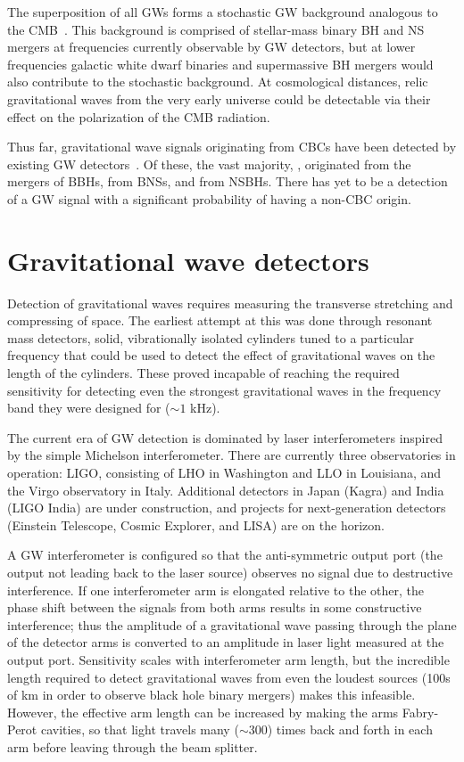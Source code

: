 The superposition of all \acp{GW} forms a stochastic \ac{GW} background analogous to the \ac{CMB}~\citep{Christensen_2018}.
This background is comprised of stellar-mass binary \ac{BH} and \ac{NS} mergers at frequencies currently observable by \ac{GW} detectors, but at lower frequencies galactic white dwarf binaries and supermassive BH mergers would also contribute to the stochastic background.
At cosmological distances, relic gravitational waves from the very early universe could be detectable via their effect on the polarization of the \ac{CMB} radiation.

Thus far, \XX gravitational wave signals originating from \acp{CBC} have been detected by existing \ac{GW} detectors~\citep{gwtc3}. Of these, the vast majority, \XX, originated from the mergers of \acp{BBH}, \XX from \acp{BNS}, and \XX from \acp{NSBH}. There has yet to be a detection of a \ac{GW} signal with a significant probability of having a non-\ac{CBC} origin.


\section{Gravitational wave detectors}\label{sec:gw-detectors}

Detection of gravitational waves requires measuring the transverse stretching and compressing of space. The earliest attempt at this was done through resonant mass detectors, solid, vibrationally isolated cylinders tuned to a particular frequency that could be used to detect the effect of gravitational waves on the length of the cylinders. These proved incapable of reaching the required sensitivity for detecting even the strongest gravitational waves in the frequency band they were designed for ($\sim1$ kHz).

The current era of \ac{GW} detection is dominated by laser interferometers inspired by the simple Michelson interferometer. There are currently three observatories in operation: \ac{LIGO}, consisting of \ac{LHO} in Washington and \ac{LLO} in Louisiana, and the Virgo observatory in Italy. Additional detectors in Japan (Kagra) and India (\ac{LIGO} India) are under construction, and projects for next-generation detectors (Einstein Telescope, Cosmic Explorer, and \ac{LISA}) are on the horizon.

A \ac{GW} interferometer is configured so that the anti-symmetric output port (the output not leading back to the laser source) observes no signal due to destructive interference. If one interferometer arm is elongated relative to the other, the phase shift between the signals from both arms results in some constructive interference; thus the amplitude of a gravitational wave passing through the plane of the detector arms is converted to an amplitude in laser light measured at the output port. Sensitivity scales with interferometer arm length, but the incredible length required to detect gravitational waves from even the loudest sources (100s of km in order to observe black hole binary mergers) makes this infeasible. However, the effective arm length can be increased by making the arms Fabry-Perot cavities, so that light travels many ($\sim300$) times back and forth in each arm before leaving through the beam splitter.

